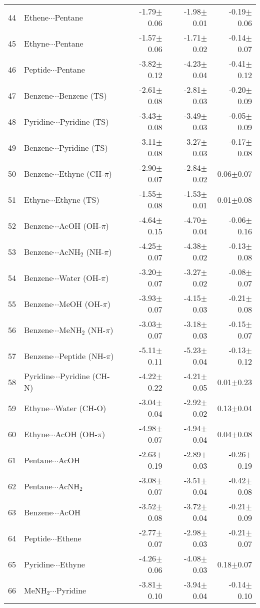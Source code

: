 \begin{longtable}{llrrr}
44 & Ethene$\cdots$Pentane & -1.79$\pm$0.06 & -1.98$\pm$0.01 & -0.19$\pm$0.06  \\
45 & Ethyne$\cdots$Pentane & -1.57$\pm$0.06 & -1.71$\pm$0.02 & -0.14$\pm$0.07  \\
46 & Peptide$\cdots$Pentane & -3.82$\pm$0.12 & -4.23$\pm$0.04 & -0.41$\pm$0.12  \\
47 & Benzene$\cdots$Benzene (TS) & -2.61$\pm$0.08 & -2.81$\pm$0.03 & -0.20$\pm$0.09  \\
48 & Pyridine$\cdots$Pyridine (TS) & -3.43$\pm$0.08 & -3.49$\pm$0.03 & -0.05$\pm$0.09  \\
49 & Benzene$\cdots$Pyridine (TS) & -3.11$\pm$0.08 & -3.27$\pm$0.03 & -0.17$\pm$0.08  \\
50 & Benzene$\cdots$Ethyne (CH-$\pi$) & -2.90$\pm$0.07 & -2.84$\pm$0.02 & 0.06$\pm$0.07  \\
51 & Ethyne$\cdots$Ethyne (TS) & -1.55$\pm$0.08 & -1.53$\pm$0.01 & 0.01$\pm$0.08  \\
52 & Benzene$\cdots$AcOH (OH-$\pi$) & -4.64$\pm$0.15 & -4.70$\pm$0.04 & -0.06$\pm$0.16  \\
53 & Benzene$\cdots$AcNH$_2$ (NH-$\pi$) & -4.25$\pm$0.07 & -4.38$\pm$0.02 & -0.13$\pm$0.08  \\
54 & Benzene$\cdots$Water (OH-$\pi$) & -3.20$\pm$0.07 & -3.27$\pm$0.02 & -0.08$\pm$0.07  \\
55 & Benzene$\cdots$MeOH (OH-$\pi$) & -3.93$\pm$0.07 & -4.15$\pm$0.03 & -0.21$\pm$0.08  \\
56 & Benzene$\cdots$MeNH$_2$ (NH-$\pi$) & -3.03$\pm$0.07 & -3.18$\pm$0.03 & -0.15$\pm$0.07  \\
57 & Benzene$\cdots$Peptide (NH-$\pi$) & -5.11$\pm$0.11 & -5.23$\pm$0.04 & -0.13$\pm$0.12  \\
58 & Pyridine$\cdots$Pyridine (CH-N) & -4.22$\pm$0.22 & -4.21$\pm$0.05 & 0.01$\pm$0.23  \\
59 & Ethyne$\cdots$Water (CH-O) & -3.04$\pm$0.04 & -2.92$\pm$0.02 & 0.13$\pm$0.04  \\
60 & Ethyne$\cdots$AcOH (OH-$\pi$) & -4.98$\pm$0.07 & -4.94$\pm$0.04 & 0.04$\pm$0.08  \\
61 & Pentane$\cdots$AcOH & -2.63$\pm$0.19 & -2.89$\pm$0.03 & -0.26$\pm$0.19  \\
62 & Pentane$\cdots$AcNH$_2$ & -3.08$\pm$0.07 & -3.51$\pm$0.04 & -0.42$\pm$0.08  \\
63 & Benzene$\cdots$AcOH & -3.52$\pm$0.08 & -3.72$\pm$0.04 & -0.21$\pm$0.09  \\
64 & Peptide$\cdots$Ethene & -2.77$\pm$0.07 & -2.98$\pm$0.03 & -0.21$\pm$0.07  \\
65 & Pyridine$\cdots$Ethyne & -4.26$\pm$0.06 & -4.08$\pm$0.03 & 0.18$\pm$0.07  \\
66 & MeNH$_2$$\cdots$Pyridine & -3.81$\pm$0.10 & -3.94$\pm$0.04 & -0.14$\pm$0.10  \\
\end{longtable}\normalsize